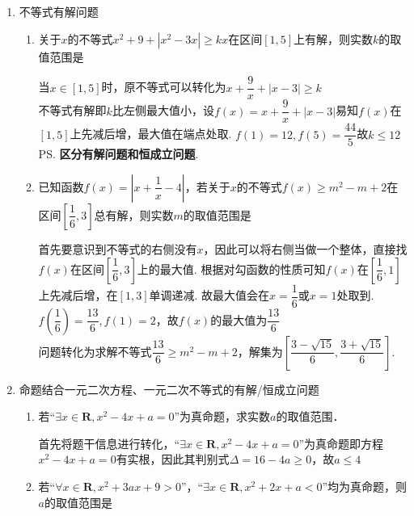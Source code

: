 \begin{enumerate}
\begin{enumerate}
    \end{enumerate}
    \item 不等式有解问题
    \begin{enumerate}
        \item 关于$x$的不等式$x^2+9+|x^2-3x| \geq kx$在区间$[1,5]$上有解，则实数$k$的取值范围是
        \begin{jieda}
            当$x \in [1, 5]$时，原不等式可以转化为$x + \dfrac{9}{x} + |x - 3| \geq k$ \\
            不等式有解即$k$比左侧最大值小，设$f(x) = x + \dfrac{9}{x} + |x - 3|$易知$f(x)$在$[1, 5]$上先减后增，最大值在端点处取. $f(1) = 12, f(5) = \dfrac{44}{5}$故$k \leq 12$\\
            \ps \textbf{区分有解问题和恒成立问题}.
        \end{jieda}
        \item 已知函数$f(x) = \left|x + \dfrac{1}{x} - 4\right|$，若关于$x$的不等式$f(x) \geq m^2-m+2$在区间$\left[\dfrac{1}{6}, 3\right]$总有解，则实数$m$的取值范围是
        \begin{jieda}
            首先要意识到不等式的右侧没有$x$，因此可以将右侧当做一个整体，直接找$f(x)$在区间$\left[\dfrac{1}{6}, 3\right]$上的最大值. 根据对勾函数的性质可知$f(x)$在$\left[\dfrac{1}{6}, 1\right]$上先减后增，在$[1, 3]$单调递减. 故最大值会在$x = \dfrac{1}{6}$或$x = 1$处取到.$f\left(\dfrac{1}{6}\right) = \dfrac{13}{6}, f(1) = 2$，故$f(x)$的最大值为$\dfrac{13}{6}$ \\
            问题转化为求解不等式$\dfrac{13}{6} \geq m^2-m+2$，解集为$\left[\dfrac{3-\sqrt{15}}{6}, \dfrac{3+\sqrt{15}}{6}\right]$. 
        \end{jieda}    
    \end{enumerate}
    \item 命题结合一元二次方程、一元二次不等式的有解/恒成立问题
    \begin{enumerate}
        \item 若“$\exists x \in \mathbf{R}, x^2 - 4x +a = 0$”为真命题，求实数$a$的取值范围．
        \begin{jieda}
            首先将题干信息进行转化，“$\exists x \in \mathbf{R}, x^2 - 4x + a = 0$”为真命题即方程$x^2 - 4x + a = 0$有实根，因此其判别式$\Delta = 16 - 4a \geq 0$，故$a \leq 4$
        \end{jieda}
        \item 若“$\forall x \in \mathbf{R}, x^2 + 3ax+ 9 > 0$”，“$\exists x \in \mathbf{R}, x^2 + 2x + a < 0$”均为真命题，则$a$的取值范围是

\end{enumerate}
\end{enumerate}
